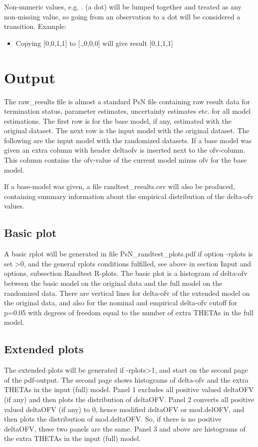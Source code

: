 \noindent Non-numeric values, e.g. . (a dot) will be lumped together and treated as any non-missing value, so going from an observation to a dot will be considered a transition. Example:
\begin{itemize}
\item Copying [0,0,1,1] to  [.,0,0,0] will give result [0,1,1,1] 
\end{itemize}

\section{Output}

The raw\_results file is almost a standard PsN file containing raw result data for termination status, parameter estimates, uncertainty estimates etc. for all model estimations. The first row is for the base model, if any, estimated with the original dataset. The next row is the input model with the original dataset. The following are the input model with the randomized datasets. If a base model was given an extra column with header deltaofv is inserted next to the ofv-column. This column contains the ofv-value of the current model minus ofv for the base model.

If a base-model was given, a file randtest\_results.csv will also be produced, 
containing summary information about the empirical distribution of the
delta-ofv values.

\subsection{Basic plot}
A basic rplot will be generated in file PsN\_randtest\_plots.pdf if option -rplots is set >0,
and the general rplots conditions fulfilled, see above in section Input and options, subsection Randtest R-plots.
The basic plot is a histogram of delta-ofv between the basic model on the original data and
the full model on the randomized data. 
There are vertical lines for delta-ofv of the extended model on the original data,
and also for the
nominal and empirical delta-ofv cutoff for p=0.05 with degrees of freedom equal to the number of extra THETAs in
the full model.

\subsection{Extended plots}
The extended plots will be generated if -rplots>1, and start on the
second page of the pdf-output.
The second page shows
histograms of delta-ofv and the extra THETAs in the input (full) model.
Panel 1 excludes all positive valued deltaOFV (if any) 
and then plots the distribution of deltaOFV. 
Panel 2 converts all positive valued deltaOFV (if any) to 0, 
hence modified deltaOFV or mod.delOFV, 
and then plots the distribution of mod.deltaOFV. 
So, if there is no positive deltaOFV, these two panels are the same.
Panel 3 and above are histograms of the extra THETAs in the input (full) model.

